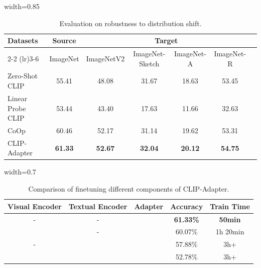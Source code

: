 \documentclass[default,iicol]{sn-jnl}%
\theoremstyle{thmstyleone}%
\theoremstyle{thmstyletwo}%
\theoremstyle{thmstylethree}%
\begin{document}
\begin{table}[ht]
\centering
\caption{Evaluation on robustness to distribution shift.}
\vspace*{5pt}
\begin{adjustbox}{width=0.85\linewidth}
\begin{tabular}{lcccccc}
\toprule
\multirow{2.5}{*}{Datasets} & \textbf{Source} & \multicolumn{4}{c}{\textbf{Target}} \\
\cmidrule(lr){2-2} \cmidrule(lr){3-6} 
& ImageNet   & ImageNetV2 & ImageNet-Sketch & ImageNet-A &  ImageNet-R  \\
\midrule
Zero-Shot CLIP  & 55.41  & 48.08 & 31.67 & 18.63 & 53.45  \\
Linear Probe CLIP  & 53.44 & 43.40 & 17.63 & 11.66 & 32.63  \\
\midrule
CoOp & 60.46  & 52.17 & 31.14  &  19.62 &  53.31 \\
CLIP-Adapter & \textbf{61.33}  & \textbf{52.67} & \textbf{32.04} & \textbf{20.12} & \textbf{54.75} \\
\bottomrule
\end{tabular}
\end{adjustbox}
\label{tab:robust}
\end{table}

\begin{table}[t!]
\centering
\caption{Comparison of finetuning different components of CLIP-Adapter.}
\vspace*{5pt}
\begin{adjustbox}{width=0.7\linewidth}
	\begin{tabular}{ccccc}
	\toprule
		Visual Encoder &Textual Encoder
		 &Adapter &Accuracy & Train Time\\ \midrule
		- & - &\Checkmark &\textbf{61.33\%} &\textbf{50min}\\
		\Checkmark & - &\Checkmark &60.07\% &1h 20min\\
		- & \Checkmark &\Checkmark &57.88\% &3h+\\
	    \Checkmark & \Checkmark & \Checkmark & 52.78\% &3h+\\
	\bottomrule
	\end{tabular}
\end{adjustbox}
\label{tab:finetune}
\end{table}
\end{document}
